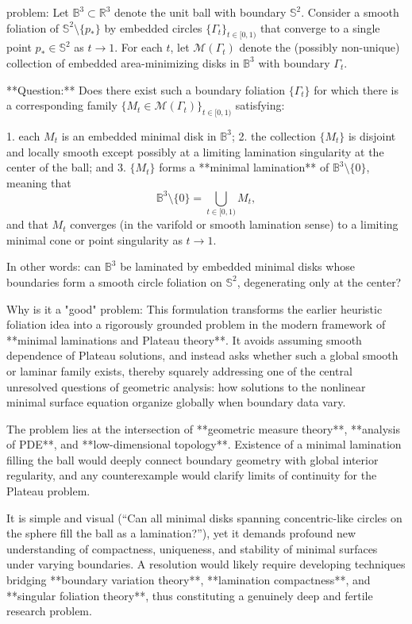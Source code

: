 problem:  
Let $\mathbb{B}^3 \subset \mathbb{R}^3$ denote the unit ball with boundary $\mathbb{S}^2$.  
Consider a smooth foliation of $\mathbb{S}^2 \setminus \{p_*\}$ by embedded circles $\{\Gamma_t\}_{t\in[0,1)}$ that converge to a single point $p_* \in \mathbb{S}^2$ as $t\to1$.  
For each $t$, let $\mathcal{M}(\Gamma_t)$ denote the (possibly non-unique) collection of embedded area-minimizing disks in $\mathbb{B}^3$ with boundary $\Gamma_t$.

**Question:**  
Does there exist such a boundary foliation $\{\Gamma_t\}$ for which there is a corresponding family $\{M_t \in \mathcal{M}(\Gamma_t)\}_{t\in[0,1)}$ satisfying:

1. each $M_t$ is an embedded minimal disk in $\mathbb{B}^3$;  
2. the collection $\{M_t\}$ is disjoint and locally smooth except possibly at a limiting lamination singularity at the center of the ball; and  
3. $\{M_t\}$ forms a **minimal lamination** of $\mathbb{B}^3 \setminus \{0\}$, meaning that  
\[
\mathbb{B}^3 \setminus \{0\} = \bigcup_{t \in [0,1)} M_t,
\]  
and that $M_t$ converges (in the varifold or smooth lamination sense) to a limiting minimal cone or point singularity as $t \to 1$.

In other words: can $\mathbb{B}^3$ be laminated by embedded minimal disks whose boundaries form a smooth circle foliation on $\mathbb{S}^2$, degenerating only at the center?

Why is it a "good" problem:  
This formulation transforms the earlier heuristic foliation idea into a rigorously grounded problem in the modern framework of **minimal laminations and Plateau theory**. It avoids assuming smooth dependence of Plateau solutions, and instead asks whether such a global smooth or laminar family exists, thereby squarely addressing one of the central unresolved questions of geometric analysis: how solutions to the nonlinear minimal surface equation organize globally when boundary data vary.  

The problem lies at the intersection of **geometric measure theory**, **analysis of PDE**, and **low-dimensional topology**. Existence of a minimal lamination filling the ball would deeply connect boundary geometry with global interior regularity, and any counterexample would clarify limits of continuity for the Plateau problem.  

It is simple and visual (“Can all minimal disks spanning concentric-like circles on the sphere fill the ball as a lamination?”), yet it demands profound new understanding of compactness, uniqueness, and stability of minimal surfaces under varying boundaries. A resolution would likely require developing techniques bridging **boundary variation theory**, **lamination compactness**, and **singular foliation theory**, thus constituting a genuinely deep and fertile research problem.